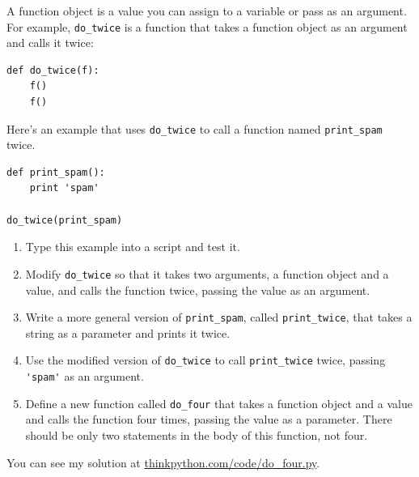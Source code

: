 \documentclass[10pt]{book}
\begin{document}
\begin{ex}

A function object is a value you can assign to a variable
or pass as an argument.  For example, \verb"do_twice" is a function
that takes a function object as an argument and calls it twice:

\beforeverb
\begin{verbatim}
def do_twice(f):
    f()
    f()
\end{verbatim}
\afterverb

Here's an example that uses \verb"do_twice" to call a function
named \verb"print_spam" twice.

\beforeverb
\begin{verbatim}
def print_spam():
    print 'spam'

do_twice(print_spam)
\end{verbatim}
\afterverb

\begin{enumerate}

\item Type this example into a script and test it.

\item Modify \verb"do_twice" so that it takes two arguments, a
function object and a value, and calls the function twice,
passing the value as an argument.

\item Write a more general version of \verb"print_spam", called
\verb"print_twice", that takes a string as a parameter and prints
it twice.

\item Use the modified version of \verb"do_twice" to call
\verb"print_twice" twice, passing \verb"'spam'" as an argument.

\item Define a new function called 
\verb"do_four" that takes a function object and a value
and calls the function four times, passing the value
as a parameter.  There should be only
two statements in the body of this function, not four.

\end{enumerate}

You can see my solution at \url{thinkpython.com/code/do_four.py}.

\end{ex}
\end{document}
